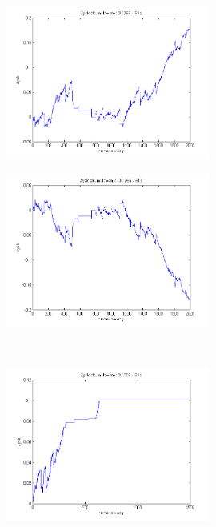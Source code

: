 \documentclass{tewiart}
\begin{document}
\begin{figure}[h]
\centering
\begin{minipage}{\linewidth}
\centering
\includegraphics[width=0.6\textwidth]{images/cadchfS1a.png}
\label{jedno}
\end{minipage}
\begin{minipage}{\linewidth}
\centering
\includegraphics[width=0.6\textwidth]{images/cadchfS1b.png}
\label{dwu}
\end{minipage}
\\
\begin{minipage}{\linewidth}
\centering
\includegraphics[width=0.6\textwidth]{images/cadchfS1c.png}
\label{cztero}
\end{minipage}
\begin{minipage}{\linewidth}

\end{minipage}
\end{figure}
\end{document}
